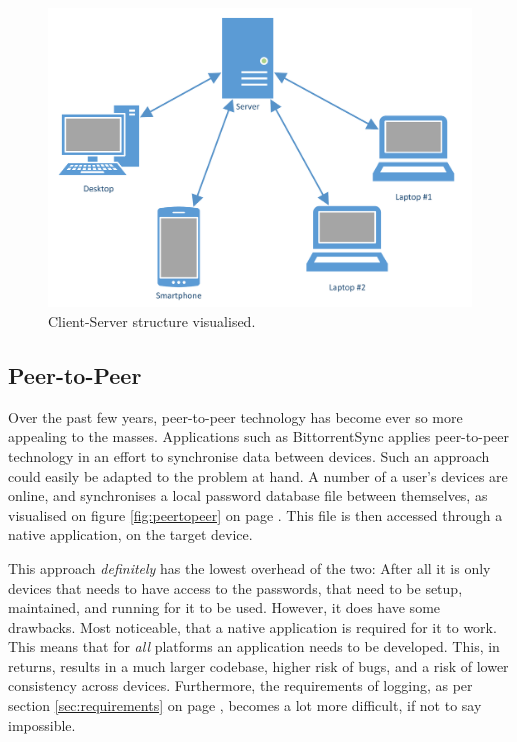 		\begin{figure}
			\centering
			\includegraphics[width=\textwidth]{figures/design/ClientServer.pdf}
			\caption{Client-Server structure visualised.}
			\label{fig:clientserver}
		\end{figure}


		\subsection{Peer-to-Peer}
			Over the past few years, peer-to-peer technology has become ever so more appealing to the masses. Applications such as BittorrentSync applies peer-to-peer technology in an effort to synchronise data between devices. Such an approach could easily be adapted to the problem at hand. A number of a user's devices are online, and synchronises a local password database file between themselves, as visualised on figure \ref{fig:peertopeer} on page \pageref{fig:peertopeer}. This file is then accessed through a native application, on the target device. 

			This approach \emph{definitely} has the lowest overhead of the two: After all it is only devices that needs to have access to the passwords, that need to be setup, maintained, and running for it to be used. However, it does have some drawbacks. Most noticeable, that a native application is required for it to work. This means that for \emph{all} platforms an application needs to be developed. This, in returns, results in a much larger codebase, higher risk of bugs, and a risk of lower consistency across devices. Furthermore, the requirements of logging, as per section \ref{sec:requirements} on page \pageref{sec:requirements}, becomes a lot more difficult, if not to say impossible.

